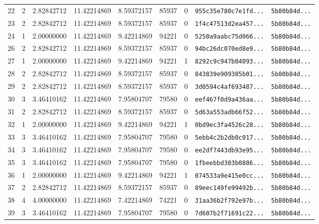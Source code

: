 \documentclass[10pt]{article}
\begin{document}
\begin{longtable}{rrrrrrrll}
  22 & 2 & 2.82842712 & 11.42214869 & 8.59372157 & 85937 & 0 & \texttt{955c35e780c7e1fd...} & \texttt{5b80b84d...} \\
  23 & 2 & 2.82842712 & 11.42214869 & 8.59372157 & 85937 & 0 & \texttt{1f4c47513d2ea457...} & \texttt{5b80b84d...} \\
  24 & 1 & 2.00000000 & 11.42214869 & 9.42214869 & 94221 & 0 & \texttt{5250a9aabc75d066...} & \texttt{5b80b84d...} \\
  26 & 2 & 2.82842712 & 11.42214869 & 8.59372157 & 85937 & 0 & \texttt{94bc26dc070ed8e9...} & \texttt{5b80b84d...} \\
  \rowcolor{cmpink!20} 27 & 1 & 2.00000000 & 11.42214869 & 9.42214869 & 94221 & 1 & \texttt{8292c9c947b04093...} & \texttt{5b80b84d...} \\
  28 & 2 & 2.82842712 & 11.42214869 & 8.59372157 & 85937 & 0 & \texttt{843839e909385b01...} & \texttt{5b80b84d...} \\
  29 & 2 & 2.82842712 & 11.42214869 & 8.59372157 & 85937 & 0 & \texttt{3d0594c4af693487...} & \texttt{5b80b84d...} \\
  30 & 3 & 3.46410162 & 11.42214869 & 7.95804707 & 79580 & 0 & \texttt{eef467f0d9a436aa...} & \texttt{5b80b84d...} \\
  31 & 2 & 2.82842712 & 11.42214869 & 8.59372157 & 85937 & 0 & \texttt{5d63a553adb66f52...} & \texttt{5b80b84d...} \\
  \rowcolor{cmpink!20} 32 & 1 & 2.00000000 & 11.42214869 & 9.42214869 & 94221 & 1 & \texttt{0bd9ec3fa4526c28...} & \texttt{5b80b84d...} \\
  33 & 3 & 3.46410162 & 11.42214869 & 7.95804707 & 79580 & 0 & \texttt{5ebb4c2b2db0c017...} & \texttt{5b80b84d...} \\
  34 & 3 & 3.46410162 & 11.42214869 & 7.95804707 & 79580 & 0 & \texttt{ee2df7443db93e95...} & \texttt{5b80b84d...} \\
  35 & 3 & 3.46410162 & 11.42214869 & 7.95804707 & 79580 & 0 & \texttt{1fbeebbd303b0886...} & \texttt{5b80b84d...} \\
  \rowcolor{cmpink!20} 36 & 1 & 2.00000000 & 11.42214869 & 9.42214869 & 94221 & 1 & \texttt{074533a9e415e0cc...} & \texttt{5b80b84d...} \\
  37 & 2 & 2.82842712 & 11.42214869 & 8.59372157 & 85937 & 0 & \texttt{89eec149fe99492b...} & \texttt{5b80b84d...} \\
  38 & 4 & 4.00000000 & 11.42214869 & 7.42214869 & 74221 & 0 & \texttt{31aa36b2f792e97b...} & \texttt{5b80b84d...} \\
  39 & 3 & 3.46410162 & 11.42214869 & 7.95804707 & 79580 & 0 & \texttt{7d607b2f71691c22...} & \texttt{5b80b84d...} \\

\end{longtable}
\end{document}

